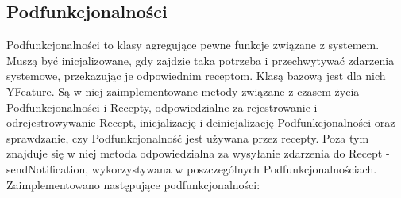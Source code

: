 \documentclass[11pt,a4paper,polish,thesis]{dcsbook}
\begin{document}
\subsection{Podfunkcjonalności}
Podfunkcjonalności to klasy agregujące pewne funkcje związane z systemem. Muszą być inicjalizowane, gdy zajdzie taka potrzeba i przechwytywać zdarzenia systemowe, przekazując je odpowiednim receptom. Klasą bazową jest dla nich YFeature. Są w niej zaimplementowane metody związane z czasem życia Podfunkcjonalności i Recepty, odpowiedzialne za rejestrowanie i odrejestrowywanie Recept, inicjalizację i deinicjalizację Podfunkcjonalności oraz sprawdzanie, czy Podfunkcjonalność jest używana przez recepty. Poza tym znajduje się w niej metoda odpowiedzialna za wysyłanie zdarzenia do Recept - sendNotification, wykorzystywana w poszczególnych Podfunkcjonalnościach. Zaimplementowano następujące podfunkcjonalności:
\end{document}
